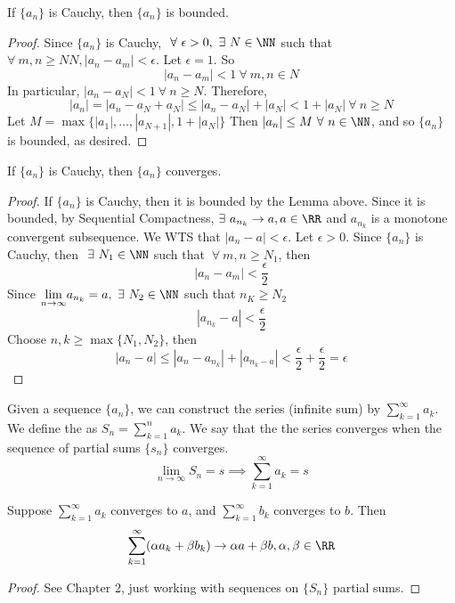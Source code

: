 \documentclass[12pt]{scrartcl}
\begin{document}
\begin{lemma}
  If $\{a_n\}$ is Cauchy, then $\{a_n\}$ is bounded. 

  \begin{proof}
    Since $\{a_n\}$ is Cauchy, $\ \forall \ \epsilon > 0, \ \exists \ N \in \NN$ such that 
    $\forall \ m, n \geq NN, |a_n - a_m| < \epsilon$. Let $\epsilon = 1$. So 
    \[|a_n - a_m| < 1 \ \forall \ m, n \in N\]
    In particular, $|a_n - a_N| < 1 \ \forall \ n \geq N$. Therefore, 
    \[|a_n| = |a_n - a_N + a_N| \leq |a_n - a_N| + |a_N| < 1 + |a_N| \ \forall \ n \geq N\]
    Let $M =\max\{|a_1|, \ldots, |a_{N+1}|, 1 + |a_N|\}$
    Then $|a_n| \leq M \ \forall \ n \in \NN$, and so $\{a_n\}$ is bounded, as desired.
  \end{proof}
\end{lemma}

\begin{theorem}
  If $\{a_n\}$ is Cauchy, then $\{a_n\}$ converges. 

  \begin{proof}
    If $\{a_n\}$ is Cauchy, then it is bounded by the Lemma above. Since it is bounded, by Sequential Compactness, 
    $\exists \ a_{n_k} \to a, a \in \RR$ and $a_{n_k}$ is a monotone convergent subsequence. We 
    WTS that $|a_n - a| < \epsilon$. Let $\epsilon > 0$. Since $\{a_n\}$ is Cauchy, then $\ \exists \ N_1 \in \NN$ such that 
    $\ \forall \ m,n \geq N_1$, then 
    \[|a_n - a_m| < \frac{\epsilon}{2}\]
    Since $\underset{n\to\infty}{\lim} a_{n_k} = a, \ \exists \ N_2 \in \NN$ such that $n_K \geq N_2$
    \[|a_{n_k} - a| < \frac{\epsilon}{2}\]
    Choose $n, k \geq \max\{N_1, N_2\}$, then 
    \[|a_n - a| \leq |a_n - a_{n_k}| + |a_{n_k - a}| < \frac{\epsilon}{2} + \frac{\epsilon}{2} = \epsilon\]
  \end{proof}
\end{theorem}

\begin{definition}
  Given a sequence $\{a_n\}$, we can construct the series (infinite sum) by $\sum_{k=1}^\infty a_k$. We define the 
   as $S_n = \sum_{k=1}^n a_k$.
  We say that the the series converges when the sequence of partial sums $\{s_n\}$ converges. 
  \[\lim_{n\to\infty} S_n = s \implies \sum_{k=1}^\infty a_k = s\]
\end{definition}

\begin{theorem}
  Suppose $\sum_{k=1}^\infty a_k$ converges to $a$, and $\sum_{k=1}^\infty b_k$ converges to $b$.  Then 
  \[\sum_{k=1}^\infty (\alpha a_k + \beta b_k) \to \alpha a + \beta b, \alpha, \beta \in \RR\]
  \begin{proof}
    See Chapter 2, just working with sequences on $\{S_n\}$ partial sums.
  \end{proof}
\end{theorem}
\end{document}
